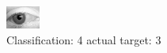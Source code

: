 \begin{figure}[h!]
\begin{center}
\includegraphics[width=0.60\columnwidth]{figures/ID2837_class_4_target_3.png}
\end{center}
\caption{ Classification: 4 actual target: 3}
\label{fig:ID2837_class_4_target_3}
\end{figure}
